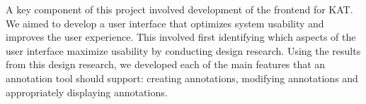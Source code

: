   A key component of this project involved development of the frontend for KAT. We aimed to develop a user interface that optimizes system usability and improves the user experience. This involved first identifying which aspects of the user interface maximize usability by conducting design research. Using the results from this design research, we developed each of the main features that an annotation tool should support: creating annotations, modifying annotations and appropriately displaying annotations.
